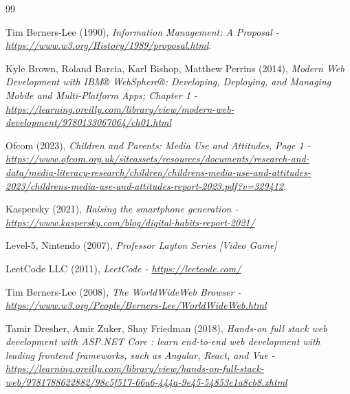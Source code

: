 \documentclass[]{final_report}
\begin{document}
\begin{thebibliography}{99}



 Tim Berners-Lee (1990),
\emph{Information Management: A Proposal - \url{https://www.w3.org/History/1989/proposal.html}}.

 Kyle Brown, Roland Barcia, Karl Bishop, Matthew Perrins (2014),
\emph{Modern Web Development with IBM® WebSphere®: Developing, Deploying, and Managing Mobile and Multi-Platform Apps; Chapter 1 - \url{https://learning.oreilly.com/library/view/modern-web-development/9780133067064/ch01.html}}

 Ofcom (2023),
\emph{Children and Parents: Media Use and Attitudes, Page 1 - \url{https://www.ofcom.org.uk/siteassets/resources/documents/research-and-data/media-literacy-research/children/childrens-media-use-and-attitudes-2023/childrens-media-use-and-attitudes-report-2023.pdf?v=329412}}.

 Kaspersky (2021),
\emph{Raising the smartphone generation - \url{https://www.kaspersky.com/blog/digital-habits-report-2021/}}

 Level-5, Nintendo (2007),
\emph{ Professor Layton Series [Video Game]}

 LeetCode LLC (2011),
\emph{LeetCode - \url{https://leetcode.com/}}


 Tim Berners-Lee (2008),
\emph{The WorldWideWeb Browser - \url{https://www.w3.org/People/Berners-Lee/WorldWideWeb.html}}

 Tamir Dresher, Amir Zuker, Shay Friedman (2018),
\emph{Hands-on full stack web development with ASP.NET Core : learn end-to-end web development with leading frontend frameworks, such as Angular, React, and Vue - \url{https://learning.oreilly.com/library/view/hands-on-full-stack-web/9781788622882/98c5f517-66a6-444a-9e45-54853e1a8cb8.xhtml}}


\end{thebibliography}
\end{document}
